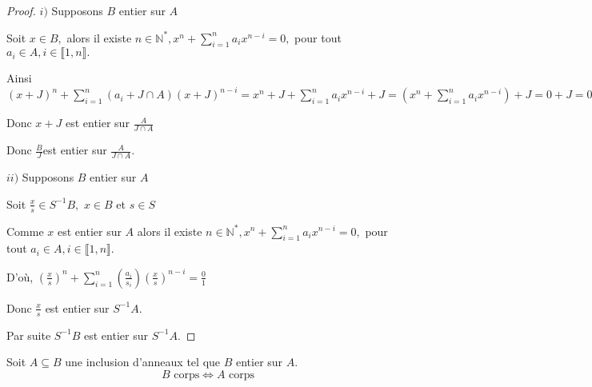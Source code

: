 \newpage
\begin{proof}
	$i)$ Supposons $B$ entier sur $A$ 
	
	Soit $x\in B,$ alors il existe $n\in \mathbb{N}^{\ast },x^{n}+\sum\limits_{i=1}^{n}a_{i}x^{n-i}=0,$ pour tout $a_{i}\in
	A,i\in \llbracket 1, n \rrbracket.$
	
	Ainsi $(x+J)^{n}+\sum\limits_{i=1}^{n}(a_{i}+J\cap
	A)(x+J)^{n-i}=x^{n}+J+\sum\limits_{i=1}^{n}a_{i}x^{n-i}+J=(x^{n}+\sum%
	\limits_{i=1}^{n}a_{i}x^{n-i})+J=0+J=0_{J\cap A}$
	
	Donc $x+J$ est entier sur $\frac{A}{J\cap A}$
	
	Donc $\frac{B}{J}$est entier sur $\frac{A}{J\cap A}.$
	
	
	
	$ii)$ Supposons $B$ entier sur $A$
	
	Soit $\frac{x}{s}\in S^{-1}B,$ $x\in B$ et $s\in S$
	
	Comme $x$ est entier sur $A$ alors il existe $n\in \mathbb{N}^{\ast },x^{n}+\sum\limits_{i=1}^{n}a_{i}x^{n-i}=0,$ pour tout $a_{i}\in
	A,i\in \llbracket 1, n \rrbracket.$
	
	D'où, $(\frac{x}{s})^{n}+\sum\limits_{i=1}^{n}(\frac{a_{i}}{s_{i}})(%
	\frac{x}{s})^{n-i}=\frac{0}{1}$
	
	Donc $\frac{x}{s}$ est entier sur $S^{-1}A.$
	
	Par suite $S^{-1}B$ est entier sur $S^{-1}A.$
\end{proof}
\begin{maproposition}
	Soit $A \subseteq B$ une inclusion d'anneaux tel que $B$ entier sur $A$.
	\[ B \text{ corps} \Longleftrightarrow  A \text{ corps} \]
\end{maproposition}
